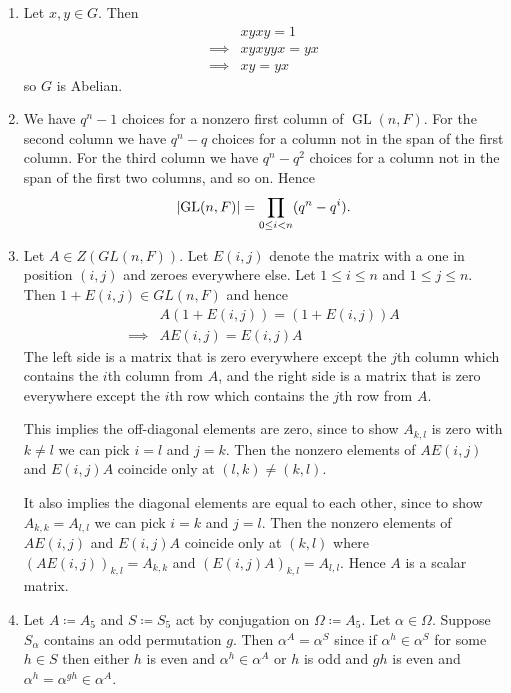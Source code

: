\documentclass[a4paper, 12pt]{article}
\DeclarePairedDelimiter\abs{\lvert}{\rvert}
\DeclareMathOperator{\GL}{GL}
\begin{document}
\begin{enumerate}

\item Let \(x,y\in G\). Then
\begin{align*}
&xyxy=1\\
\implies{}&xyxyyx=yx\\
\implies{}&xy=yx
\end{align*}
so \(G\) is Abelian.

\item We have \(q^n-1\) choices for a nonzero first column of \(\GL(n,F)\). For the second column we have \(q^n-q\) choices for a column not in the span of the first column. For the third column we have \(q^n-q^2\) choices for a column not in the span of the first two columns, and so on. Hence
\[\abs{\GL(n,F)}=\prod_{0\leq i<n}(q^n-q^i).\]

\item Let \(A\in Z(GL(n,F))\). Let \(E(i,j)\) denote the matrix with a one in position \((i,j)\) and zeroes everywhere else. Let \(1\leq i\leq n\) and \(1\leq j\leq n\). Then \(1+E(i,j)\in GL(n,F)\) and hence 
\begin{align*}
&A(1+E(i,j))=(1+E(i,j))A\\
\implies{}&AE(i,j)=E(i,j)A
\end{align*}
The left side is a matrix that is zero everywhere except the \(j\)th column which contains the \(i\)th column from \(A\), and the right side is a matrix that is zero everywhere except the \(i\)th row which contains the \(j\)th row from \(A\).

This implies the off-diagonal elements are zero, since to show \(A_{k,l}\) is zero with \(k\neq l\) we can pick \(i=l\) and \(j=k\). Then the nonzero elements of \(AE(i,j)\) and \(E(i,j)A\) coincide only at \((l,k)\neq(k,l)\).

It also implies the diagonal elements are equal to each other, since to show \(A_{k,k}=A_{l,l}\) we can pick \(i=k\) and \(j=l\). Then the nonzero elements of \(AE(i,j)\) and \(E(i,j)A\) coincide only at \((k,l)\) where \((AE(i,j))_{k,l}=A_{k,k}\) and \((E(i,j)A)_{k,l}=A_{l,l}\). Hence \(A\) is a scalar matrix.

\item Let \(A\coloneqq A_5\) and \(S\coloneqq S_5\) act by conjugation on \(\Omega\coloneqq A_5\). Let \(\alpha\in\Omega\). Suppose \(S_\alpha\) contains an odd permutation \(g\). Then \(\alpha^A=\alpha^S\) since if \(\alpha^h\in\alpha^S\) for some \(h\in S\) then either \(h\) is even and \(\alpha^h\in\alpha^A\) or \(h\) is odd and \(gh\) is even and \(\alpha^h=\alpha^{gh}\in\alpha^A\).


\end{enumerate}
\end{document}
